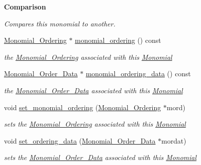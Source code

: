 \begin{Indent}\textbf{ Comparison}\par
{\em Compares this monomial to another. }\begin{DoxyCompactItemize}
\item 
\mbox{\label{class_monomial_a2d3837bddca72c311f95a3fdfdc87254}} 
\hyperlink{class_monomial___ordering}{Monomial\+\_\+\+Ordering} $\ast$ \hyperlink{class_monomial_a2d3837bddca72c311f95a3fdfdc87254}{monomial\+\_\+ordering} () const
\begin{DoxyCompactList}\small\item\em the \hyperlink{class_monomial___ordering}{Monomial\+\_\+\+Ordering} associated with this \hyperlink{class_monomial}{Monomial} \end{DoxyCompactList}\item 
\mbox{\label{class_monomial_a30118021706530910a7cf7e9f60b429e}} 
\hyperlink{class_monomial___order___data}{Monomial\+\_\+\+Order\+\_\+\+Data} $\ast$ \hyperlink{class_monomial_a30118021706530910a7cf7e9f60b429e}{monomial\+\_\+ordering\+\_\+data} () const
\begin{DoxyCompactList}\small\item\em the \hyperlink{class_monomial___order___data}{Monomial\+\_\+\+Order\+\_\+\+Data} associated with this \hyperlink{class_monomial}{Monomial} \end{DoxyCompactList}\item 
\mbox{\label{class_monomial_a43b6b8e2753b5b9f9e775424070513f8}} 
void \hyperlink{class_monomial_a43b6b8e2753b5b9f9e775424070513f8}{set\+\_\+monomial\+\_\+ordering} (\hyperlink{class_monomial___ordering}{Monomial\+\_\+\+Ordering} $\ast$mord)
\begin{DoxyCompactList}\small\item\em sets the \hyperlink{class_monomial___ordering}{Monomial\+\_\+\+Ordering} associated with this \hyperlink{class_monomial}{Monomial} \end{DoxyCompactList}\item 
\mbox{\label{class_monomial_afc14eaf6e15b94990b469e941d3c546d}} 
void \hyperlink{class_monomial_afc14eaf6e15b94990b469e941d3c546d}{set\+\_\+ordering\+\_\+data} (\hyperlink{class_monomial___order___data}{Monomial\+\_\+\+Order\+\_\+\+Data} $\ast$mordat)
\begin{DoxyCompactList}\small\item\em sets the \hyperlink{class_monomial___order___data}{Monomial\+\_\+\+Order\+\_\+\+Data} associated with this \hyperlink{class_monomial}{Monomial} \end{DoxyCompactList}\item 

\end{DoxyCompactItemize}
\end{Indent}
